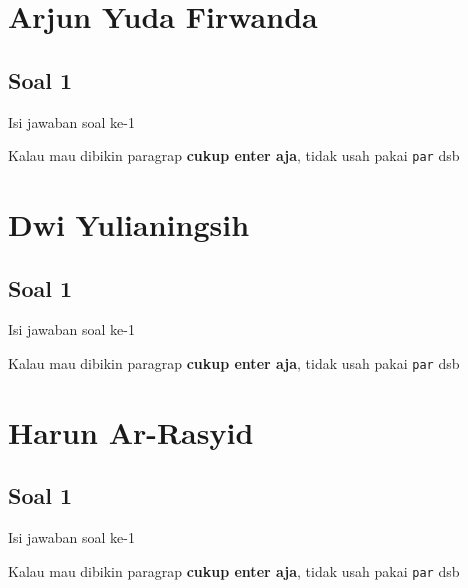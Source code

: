 \section{Arjun Yuda Firwanda}
\subsection{Soal 1}
Isi jawaban soal ke-1

Kalau mau dibikin paragrap \textbf{cukup enter aja}, tidak usah pakai \verb|par| dsb



\section{Dwi Yulianingsih}
\subsection{Soal 1}
Isi jawaban soal ke-1

Kalau mau dibikin paragrap \textbf{cukup enter aja}, tidak usah pakai \verb|par| dsb



\section{Harun Ar-Rasyid}
\subsection{Soal 1}
Isi jawaban soal ke-1

Kalau mau dibikin paragrap \textbf{cukup enter aja}, tidak usah pakai \verb|par| dsb

